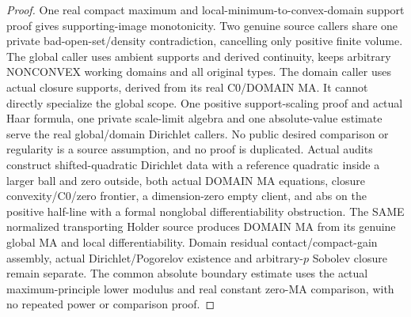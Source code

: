 \begin{proof}
  \leanok
  One real compact maximum and local-minimum-to-convex-domain support proof
  gives supporting-image monotonicity. Two genuine source callers share one
  private bad-open-set/density contradiction, cancelling only positive finite
  volume. The global caller uses ambient supports and derived continuity, keeps
  arbitrary NONCONVEX working domains and all original types. The domain caller
  uses actual closure supports, derived from its real C0/DOMAIN MA. It cannot
  directly specialize the global scope. One positive support-scaling proof and
  actual Haar formula, one private scale-limit algebra and one absolute-value
  estimate serve the real global/domain Dirichlet callers. No public desired
  comparison or regularity is a source assumption, and no proof is duplicated.
  Actual audits construct shifted-quadratic Dirichlet data with a reference
  quadratic inside a larger ball and zero outside, both actual DOMAIN MA
  equations, closure convexity/C0/zero frontier, a dimension-zero empty client,
  and abs on the positive half-line with a formal nonglobal differentiability
  obstruction. The SAME normalized transporting Holder source produces DOMAIN
  MA from its genuine global MA and local differentiability. Domain residual
  contact/compact-gain assembly, actual Dirichlet/Pogorelov existence and
  arbitrary-$p$ Sobolev closure remain separate. The common absolute boundary
  estimate uses the actual maximum-principle lower modulus and real constant
  zero-MA comparison, with no repeated power or comparison proof.
\end{proof}



